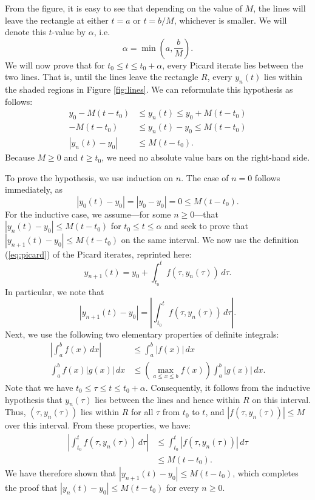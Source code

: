 \documentclass{myart}
\newcommand{\eq}[1]{(\ref{eq:#1})}
\newcommand{\Figure}[1]{Figure \ref{fig:#1}}
\begin{document}
From the figure, it is easy to see that depending on the value of $M$, the lines will leave the rectangle at either $t = a$ or $t = b/M$, whichever is smaller. We will denote this $t$-value by $\alpha$, i.e.
\begin{equation*}
\alpha = \min\left(a, \frac{b}{M}\right).
\end{equation*}
We will now prove that for $t_0 \leq t \leq t_0 + \alpha$, every Picard iterate lies between the two lines. That is, until the lines leave the rectangle $R$, every $y_n(t)$ lies within the shaded regions in \Figure{lines}. We can reformulate this hypothesis as follows:
\begin{align*}
y_0 - M(t - t_0) &\leq y_n(t) \leq y_0 + M(t - t_0) \\
-M(t - t_0) &\leq y_n(t) - y_0 \leq M(t - t_0) \\
|y_n(t) - y_0| &\leq M(t - t_0).
\end{align*}
Because $M \geq 0$ and $t \geq t_0$, we need no absolute value bars on the right-hand side.

To prove the hypothesis, we use induction on $n$. The case of $n = 0$ follows immediately, as
\begin{equation*}
|y_0(t) - y_0| = |y_0 - y_0| = 0 \leq M(t - t_0).
\end{equation*}
For the inductive case, we assume---for some $n \geq 0$---that $|y_n(t) - y_0| \leq M(t - t_0)$ for $t_0 \leq t \leq \alpha$ and seek to prove that $|y_{n+1}(t) - y_0| \leq M(t - t_0)$ on the same interval. We now use the definition \eq{picard} of the Picard iterates, reprinted here:
\begin{equation*}
y_{n+1}(t) = y_0 + \int_{t_0}^t f(\tau, y_n(\tau)) \,d\tau.
\end{equation*}
In particular, we note that
\begin{equation*}
|y_{n+1}(t) - y_0| = \left|\int_{t_0}^t f(\tau, y_n(\tau)) \,d\tau\right|.
\end{equation*}
Next, we use the following two elementary properties of definite integrals:
\begin{align*}
\left|\int_a^b f(x) \,dx\right| &\leq \int_a^b |f(x)| \,dx \\
\int_a^b f(x)|g(x)| \,dx &\leq \left(\max_{a \leq x \leq b} f(x)\right)\int_a^b |g(x)| \,dx.
\end{align*}
Note that we have $t_0 \leq \tau \leq t \leq t_0 + \alpha$. Consequently, it follows from the inductive hypothesis that $y_n(\tau)$ lies between the lines and hence within $R$ on this interval. Thus, $(\tau, y_n(\tau))$ lies within $R$ for all $\tau$ from $t_0$ to $t$, and $|f(\tau, y_n(\tau))| \leq M$ over this interval. From these properties, we have:
\begin{align*}
\left|\int_{t_0}^t f(\tau, y_n(\tau)) \,d\tau\right| &\leq \int_{t_0}^t |f(\tau, y_n(\tau))| \,d\tau \\
&\leq M(t - t_0).
\end{align*}
We have therefore shown that $|y_{n+1}(t) - y_0| \leq M(t - t_0)$, which completes the proof that $|y_n(t) - y_0| \leq M(t - t_0)$ for every $n \geq 0$.
\end{document}
